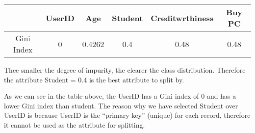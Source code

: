 		\begin{table}[H]
			\begin{tabular}{ c | c | c | c | c | c }
				 & UserID & Age & Student & Creditwrthiness & Buy PC \\ \hline
				Gini Index & 0 & 0.4262 & 0.4 & 0.48 & 0.48 \\ 
			\end{tabular}
		\end{table}

		Thee smaller the degree of impurity, the clearer the class distribution. 
		Therefore the attribute Student = 0.4 is the best attribute to split by.

		As we can see in the table above, the UserID has a Gini index of 0 and has 
		a lower Gini index than student. The reason why we have selected Student over
		UserID is because UserID is the “primary key” (unique) for each 
		record, therefore it cannot be used as the attribute for splitting.
